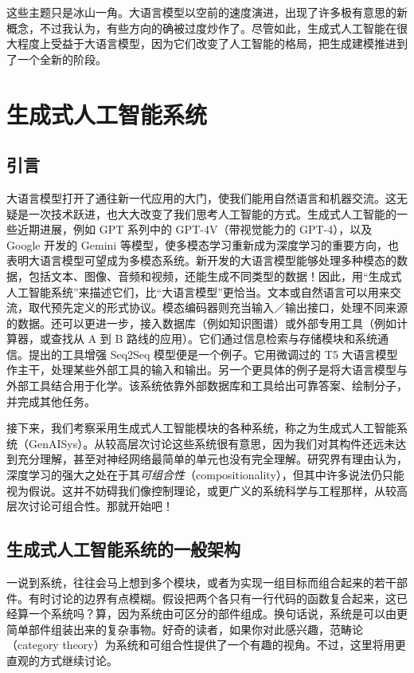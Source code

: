这些主题只是冰山一角。大语言模型以空前的速度演进，出现了许多极有意思的新概念，不过我认为，有些方向的确被过度炒作了。尽管如此，生成式人工智能在很大程度上受益于大语言模型，因为它们改变了人工智能的格局，把生成建模推进到了一个全新的阶段。

\section{生成式人工智能系统}
\subsection{引言}
大语言模型打开了通往新一代应用的大门，使我们能用自然语言和机器交流。这无疑是一次技术跃进，也大大改变了我们思考人工智能的方式。生成式人工智能的一些近期进展，例如 GPT 系列中的 GPT-4V（带视觉能力的 GPT-4），以及 Google 开发的 Gemini 等模型，使多模态学习重新成为深度学习的重要方向，也表明大语言模型可望成为多模态系统。新开发的大语言模型能够处理多种模态的数据，包括文本、图像、音频和视频，还能生成不同类型的数据！因此，用“生成式人工智能系统”来描述它们，比“大语言模型”更恰当。文本或自然语言可以用来交流，取代预先定义的形式协议。模态编码器则充当输入／输出接口，处理不同来源的数据。还可以更进一步，接入数据库（例如知识图谱）或外部专用工具（例如计算器，或查找从 A 到 B 路线的应用）。它们通过信息检索与存储模块和系统通信。提出的工具增强 Seq2Seq 模型便是一个例子。它用微调过的 T5 大语言模型作主干，处理某些外部工具的输入和输出。另一个更具体的例子是将大语言模型与外部工具结合用于化学。该系统依靠外部数据库和工具给出可靠答案、绘制分子，并完成其他任务。

接下来，我们考察采用生成式人工智能模块的各种系统，称之为生成式人工智能系统（GenAISys）。从较高层次讨论这些系统很有意思，因为我们对其构件还远未达到充分理解，甚至对神经网络最简单的单元也没有完全理解。研究界有理由认为，深度学习的强大之处在于其\emph{可组合性}（compositionality），但其中许多说法仍只能视为假说。这并不妨碍我们像控制理论，或更广义的系统科学与工程那样，从较高层次讨论可组合性。那就开始吧！

\subsection{生成式人工智能系统的一般架构}
一说到系统，往往会马上想到多个模块，或者为实现一组目标而组合起来的若干部件。有时讨论的边界有点模糊。假设把两个各只有一行代码的函数复合起来，这已经算一个系统吗？算，因为系统由可区分的部件组成。换句话说，系统是可以由更简单部件组装出来的复杂事物。好奇的读者，如果你对此感兴趣，范畴论（category theory）为系统和可组合性提供了一个有趣的视角。不过，这里将用更直观的方式继续讨论。

